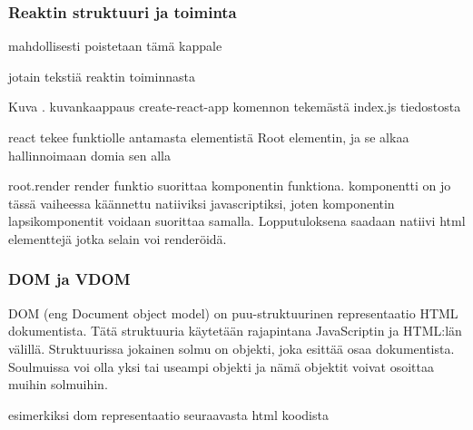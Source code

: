 \subsubsection{Reaktin struktuuri ja toiminta}
mahdollisesti poistetaan  tämä kappale





jotain tekstiä reaktin toiminnasta 
\bigskip



Kuva \getImgCount{}. kuvankaappaus create-react-app komennon tekemästä index.js tiedostosta
\medskip

react tekee funktiolle antamasta elementistä Root elementin, ja se alkaa hallinnoimaan domia sen alla
\medskip


root.render
render funktio suorittaa komponentin funktiona. komponentti on jo tässä vaiheessa käännettu natiiviksi javascriptiksi, 
joten komponentin lapsikomponentit voidaan suorittaa samalla. Lopputuloksena saadaan natiivi html elementtejä jotka selain voi renderöidä.

\medskip



\subsubsection{DOM ja VDOM}


DOM (eng Document object model) on puu-struktuurinen representaatio HTML dokumentista.
Tätä struktuuria käytetään rajapintana JavaScriptin ja HTML:län välillä. 
Struktuurissa jokainen solmu on objekti, joka esittää osaa dokumentista. 
Soulmuissa voi olla yksi tai useampi objekti ja nämä objektit voivat osoittaa muihin solmuihin.



esimerkiksi dom representaatio seuraavasta html koodista

